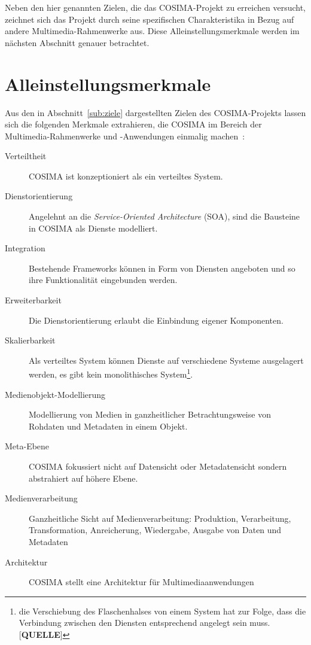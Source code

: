   Neben den hier genannten Zielen, die das COSIMA-Projekt zu erreichen versucht, zeichnet sich das Projekt durch seine spezifischen Charakteristika in Bezug auf andere Multimedia-Rahmenwerke aus. Diese Alleinstellungsmerkmale werden im nächsten Abschnitt genauer betrachtet.


  

\section{Alleinstellungsmerkmale} %
\label{sec:alleinstellungsmerkmale}

  Aus den in Abschnitt~\ref{sub:ziele} dargestellten Zielen des COSIMA-Projekts lassen sich die folgenden Merkmale extrahieren, die COSIMA im Bereich der Multimedia-Rahmenwerke und -Anwendungen einmalig machen~\citep[S. 3f]{bericht}:
  
  \begin{description}
    \item[Verteiltheit] COSIMA ist konzeptioniert als ein verteiltes System.
    \item[Dienstorientierung] Angelehnt an die \emph{Service-Oriented Architecture} (SOA), sind die Bausteine in COSIMA als Dienste modelliert.
    \item[Integration] Bestehende Frameworks können in Form von Diensten angeboten und so ihre Funktionalität eingebunden werden.
    \item[Erweiterbarkeit] Die Dienstorientierung erlaubt die Einbindung eigener Komponenten.
    \item[Skalierbarkeit] Als verteiltes System können Dienste auf verschiedene Systeme ausgelagert werden, es gibt kein monolithisches System\footnote{die Verschiebung des Flaschenhalses von einem System hat zur Folge, dass die Verbindung zwischen den Diensten entsprechend angelegt sein muss. [\textbf{QUELLE}]}.
    \item[Medienobjekt-Modellierung] Modellierung von Medien in ganzheitlicher Betrachtungsweise von Rohdaten und Metadaten in einem Objekt.
    \item[Meta-Ebene] COSIMA fokussiert nicht auf Datensicht oder Metadatensicht sondern abstrahiert auf höhere Ebene.
    \item[Medienverarbeitung] Ganzheitliche Sicht auf Medienverarbeitung: Produktion, Verarbeitung, Transformation, Anreicherung, Wiedergabe, Ausgabe von Daten und Metadaten
    \item[Architektur] COSIMA stellt eine Architektur für Multimediaanwendungen
  \end{description}
  
